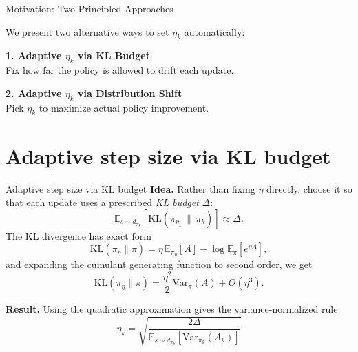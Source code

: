 \documentclass[9pt]{beamer}
\newcommand{\KL}{\mathrm{KL}}
\newcommand{\Var}{\mathrm{Var}}
\begin{document}
\begin{frame}{Motivation: Two Principled Approaches}
\vspace{1em}

We present two alternative ways to set {\color{cEta}$\eta_k$} automatically:

\vspace{2em}

\begin{center}
\begin{minipage}{0.85\textwidth}
\raggedright

\textbf{\large 1. Adaptive {\color{cEta}$\eta_k$} via KL Budget} \\[0.3em]
\hspace{1.5em}Fix how far the policy is allowed to drift each update.

\vspace{1.5em}

\textbf{\large 2. Adaptive {\color{cEta}$\eta_k$} via Distribution Shift} \\[0.3em]
\hspace{1.5em}Pick {\color{cEta}$\eta_k$} to maximize actual policy improvement.

\end{minipage}
\end{center}
\end{frame}



\section{Adaptive step size via KL budget}
\begin{frame}{Adaptive step size via KL budget}
\small
\textbf{Idea.}
Rather than fixing $\eta$ directly, choose it so that each update uses a prescribed \emph{KL budget} $\Delta$:
\[
\mathbb{E}_{s\sim d_{\pi_k}}\!\left[\KL(\pi_{\eta_k}\,\|\,\pi_k)\right]\approx \Delta.
\]
The KL divergence has exact form
\[
\KL(\pi_\eta\|\pi)=\eta\,\mathbb{E}_{\pi_\eta}[A]-\log \mathbb{E}_\pi[e^{\eta A}],
\]
and expanding the cumulant generating function to second order, we get
\[
\KL(\pi_\eta\|\pi)=\frac{\eta^2}{2}\Var_\pi(A)+O(\eta^3).
\]

\medskip
\textbf{Result.}
Using the quadratic approximation gives the variance-normalized rule
\[
\boxed{
\eta_k
=
\sqrt{
\frac{2\Delta}{
\mathbb{E}_{s\sim d_{\pi_k}}
[\Var_{\pi_k}(A_k)]
}}
}
\]
\end{frame}
\end{document}
